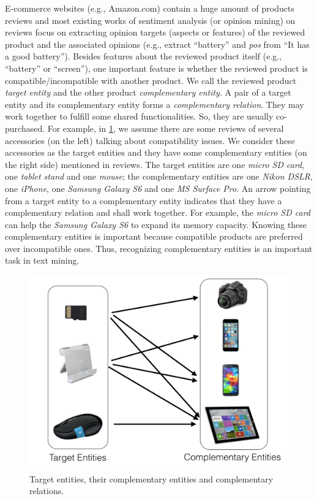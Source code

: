 E-commerce websites (e.g., Amazon.com) contain a huge amount of products reviews and most existing works of sentiment analysis \cite{pang2002thumbs} (or opinion mining) on reviews focus on extracting opinion targets (aspects or features) of the reviewed product and the associated opinions \cite{hu2004mining,popescu2007extracting,liu2015sentiment} (e.g., extract ``battery'' and \textit{pos} from ``It has a good battery''). Besides features about the reviewed product itself (e.g., ``battery'' or ``screen''), one important feature is whether the reviewed product is compatible/incompatible with another product. We call the reviewed product \emph{target entity} and the other product \emph{complementary entity}. A pair of a target entity and its complementary entity forms a \emph{complementary relation}. They may work together to fulfill some shared functionalities. So, they are usually co-purchased. For example, in \ref{fig:sc}, we assume there are some reviews of several accessories (on the left) talking about compatibility issues. We consider these accessories as the target entities and they have some complementary entities (on the right side) mentioned in reviews. The target entities are one \textit{micro SD card}, one \textit{tablet stand} and one \textit{mouse}; the complementary entities are one \textit{Nikon DSLR}, one \textit{iPhone}, one \textit{Samsung Galaxy S6} and one \textit{MS Surface Pro}. An arrow pointing from a target entity to a complementary entity indicates that they have a complementary relation and shall work together. For example, the \textit{micro SD card} can help the \textit{Samsung Galaxy S6} to expand its memory capacity. Knowing these complementary entities is important because compatible products are preferred over incompatible ones. Thus, recognizing complementary entities is an important task in text mining.

\begin{figure} %
   \centering
   \includegraphics[width=5.in]{fig/bd16_sub_comp.jpg}
   \caption{Target entities, their complementary entities and complementary relations.}
   \label{fig:sc}
\end{figure}

